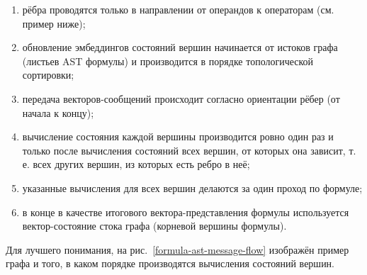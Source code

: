 \begin{enumerate}
    \item рёбра проводятся только в направлении от операндов к операторам (см. пример ниже);
    \item обновление эмбеддингов состояний вершин начинается от истоков графа (листьев AST формулы) и производится в порядке топологической сортировки;
    \item передача векторов-сообщений происходит согласно ориентации рёбер (от начала к концу);
    \item вычисление состояния каждой вершины производится ровно один раз и только после вычисления состояний всех вершин, от которых она зависит, т. е. всех других вершин, из которых есть ребро в неё;
    \item указанные вычисления для всех вершин делаются за один проход по формуле;
    \item в конце в качестве итогового вектора-представления формулы используется вектор-состояние стока графа (корневой вершины формулы).
\end{enumerate}

Для лучшего понимания, на рис.~\ref{formula-ast-message-flow} изображён пример графа и того, в каком порядке производятся вычисления состояний вершин.

